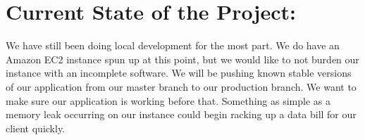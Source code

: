 \documentclass[letterpaper,10pt,serif,draftclsnofoot,onecolumn,compsoc,titlepage]{IEEEtran}
\begin{document}
\section{Current State of the Project:}
    We have still been doing local development for the most part. We do have an Amazon EC2 instance spun up at this point, but we would like to not burden our instance with an incomplete software. We will be pushing known stable versions of our application from our master branch to our production branch. We want to make sure our application is working before that. Something as simple as a memory leak occurring on our instance could begin racking up a data bill for our client quickly.\\

\newpage


\end{document}
